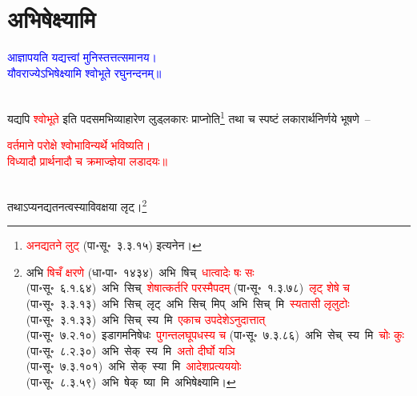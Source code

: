 \section[अभिषेक्ष्यामि]{अभिषेक्ष्यामि}
\centering\textcolor{blue}{आज्ञापयति यद्यत्त्वां मुनिस्तत्तत्समानय।\nopagebreak\\
यौवराज्येऽभिषेक्ष्यामि श्वोभूते रघुनन्दनम्॥}\nopagebreak\\
\\
\fontsize{14}{21}\selectfont\begin{sloppypar}\justifying\noindent\hspace{10mm} यद्यपि \textcolor{red}{श्वोभूते} इति पद\-समभिव्याहारेण लुड्लकारः प्राप्नोति\footnote{\textcolor{red}{अनद्यतने लुट्} (पा॰सू॰~३.३.१५) इत्यनेन।} तथा च स्पष्टं लकारार्थ\-निर्णये भूषणे~–\end{sloppypar}
\centering\textcolor{red}{वर्तमाने परोक्षे श्वोभाविन्यर्थे भविष्यति।\nopagebreak\\
विध्यादौ प्रार्थनादौ च क्रमाज्ज्ञेया लडादयः॥}\nopagebreak\\
\\
\fontsize{14}{21}\selectfont\begin{sloppypar}\justifying\noindent तथाऽप्यनद्यतनत्वस्याविवक्षया लृट्।\footnote{अभि \textcolor{red}{षिचँ क्षरणे} (धा॰पा॰~१४३४)~\arrow अभि~षिच्~\arrow \textcolor{red}{धात्वादेः षः सः} (पा॰सू॰~६.१.६४)~\arrow अभि~सिच्~\arrow \textcolor{red}{शेषात्कर्तरि परस्मैपदम्} (पा॰सू॰~१.३.७८)~\arrow \textcolor{red}{लृट् शेषे च} (पा॰सू॰~३.३.१३)~\arrow अभि~सिच्~लृट्~\arrow अभि~सिच्~मिप्~\arrow अभि~सिच्~मि~\arrow \textcolor{red}{स्यतासी लृलुटोः} (पा॰सू॰~३.१.३३)~\arrow अभि~सिच्~स्य~मि~\arrow \textcolor{red}{एकाच उपदेशेऽनुदात्तात्‌} (पा॰सू॰~७.२.१०)~\arrow इडागम\-निषेधः~\arrow \textcolor{red}{पुगन्त\-लघूपधस्य च} (पा॰सू॰~७.३.८६)~\arrow अभि~सेच्~स्य~मि~\arrow \textcolor{red}{चोः कुः} (पा॰सू॰~८.२.३०)~\arrow अभि~सेक्~स्य~मि~\arrow \textcolor{red}{अतो दीर्घो यञि} (पा॰सू॰~७.३.१०१)~\arrow अभि~सेक्~स्या~मि~\arrow \textcolor{red}{आदेश\-प्रत्यययोः} (पा॰सू॰~८.३.५९)~\arrow अभि~षेक्~ष्या~मि~\arrow अभिषेक्ष्यामि।}\end{sloppypar}
